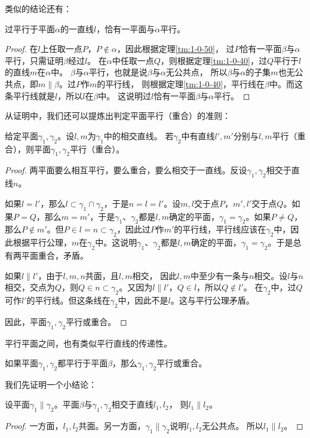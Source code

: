\documentclass[12pt,UTF8,fontset=none]{ctexbook}
\begin{document}
类似的结论还有：

\begin{tm}\label{tm:1-0-60}
    过平行于平面$\alpha$的一直线$l$，恰有一平面与$\alpha$平行。
\end{tm}
\begin{proof}
在$l$上任取一点$P$，$P\notin \alpha$，因此根据定理\ref{tm:1-0-50}，
过$P$恰有一平面$\beta$与$\alpha$平行，只需证明$\beta$经过$l$。
在$\alpha$中任取一点$Q$，则根据定理\ref{tm:1-0-40}，过$Q$平行于$l$的直线$m$在$\alpha$中。
$\beta$与$\alpha$平行，也就是说$\beta$与$\alpha$无公共点，
所以$\beta$与$\alpha$的子集$m$也无公共点，即$m\parallel \beta$。过$P$作$m$的平行线，
则根据定理\ref{tm:1-0-40}，平行线在$\beta$中。而这条平行线就是$l$，所以$l$在$\beta$中。
这说明过$l$恰有一平面$\beta$与$\alpha$平行。
\end{proof}

从证明中，我们还可以提炼出判定平面平行（重合）的准则：

\begin{tm}\label{tm:1-0-70}
    给定平面$\gamma_1, \gamma_2$。设$l,m$为$\gamma_1$中的相交直线。
    若$\gamma_2$中有直线$l',m'$分别与$l,m$平行（重合），则平面$\gamma_1, \gamma_2$平行（重合）。
\end{tm}
\begin{proof}
    两平面要么相互平行，要么重合，要么相交于一直线。反设$\gamma_1, \gamma_2$相交于直线$n$。

    如果$l=l'$，那么$l\subset \gamma_1\cap\gamma_2$，于是$n=l=l'$。设$m,l$交于点$P$，$m',l'$交于点$Q$。如果$P=Q$，那么$m=m'$，于是$\gamma_1$、$\gamma_2$都是$l,m$确定的平面，$\gamma_1=\gamma_2$。如果$P\neq Q$，那么$P\notin m'$。但$P\in l=n\subset\gamma_2$，因此过$P$作$m'$的平行线，平行线应该在$\gamma_2$中，因此根据平行公理，$m$在$\gamma_2$中。这说明$\gamma_1$、$\gamma_2$都是$l,m$确定的平面，$\gamma_1=\gamma_2$。于是总有两平面重合，矛盾。

    如果$l\parallel l'$，由于$l,m,n$共面，且$l,m$相交，
    因此$l,m$中至少有一条与$n$相交。设$l$与$n$相交，交点为$Q$，则$Q\in n\subset\gamma_2$。又因为$l\parallel l'$，$Q\in l$，所以$Q\notin l'$。
    在$\gamma_2$中，过$Q$可作$l'$的平行线。但这条线在$\gamma_2$中，因此不是$l$。这与平行公理矛盾。

    因此，平面$\gamma_1, \gamma_2$平行或重合。
\end{proof}

平行平面之间，也有类似平行直线的传递性。
\begin{tm}\label{tm:1-0-80}
如果平面$\gamma_1,\gamma_2$都平行于平面$\beta$，那么$\gamma_1,\gamma_2$平行或重合。
\end{tm}
我们先证明一个小结论：
\begin{tm}\label{tm:1-0-90}
    设平面$\gamma_1\parallel \gamma_2$。平面$\beta$与$\gamma_1,\gamma_2$相交于直线$l_1,l_2$，
    则$l_1\parallel l_2$。
\end{tm}
\begin{proof}
    一方面，$l_1,l_2$共面。另一方面，$\gamma_1\parallel \gamma_2$说明$l_1,l_2$无公共点。
    所以$l_1\parallel l_2$。
\end{proof}
\end{document}
